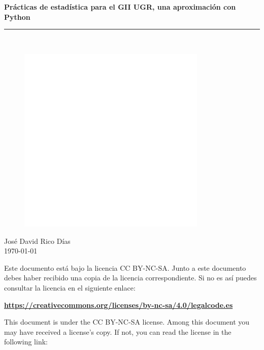 \documentclass[openany,a4paper]{book}
\begin{document}
 
\begin{titlepage}
	\begin{center}		
		\vspace*{1.0cm}
		\begin{Huge}
			\textbf{Prácticas de estadística para el GII UGR, una aproximación con Python}\\
		\end{Huge}	
		\vspace*{1.0cm}
		\rule{150mm}{0.1mm}\\
		
		\vspace*{1.5cm}
		\begin{figure}[htb]
			\begin{center}
				\includegraphics[width=9cm]{images/logotypes/Logo UGR.png}
			\end{center}
		\end{figure}
        \huge{José David Rico Días}\\
		\vspace*{1cm}
	    \Large{\today}
	\end{center}		
\end{titlepage}

\thispagestyle{empty}

Este documento está bajo la licencia CC BY-NC-SA. Junto a este documento debes haber recibido una copia de la licencia correspondiente. Si no es así puedes consultar la licencia en el siguiente enlace: 

\textbf{\href{https://creativecommons.org/licenses/by-nc-sa/4.0/legalcode.es}{https://creativecommons.org/licenses/by-nc-sa/4.0/legalcode.es}}

This document is under the CC BY-NC-SA license. Among this document you may have received a license's copy. If not, you can read the license in the following link: 
\end{document}
